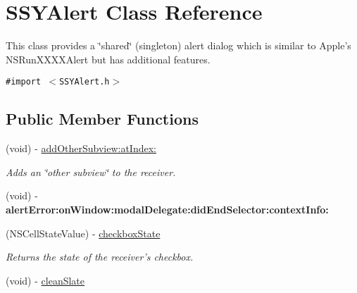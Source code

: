\hypertarget{interface_s_s_y_alert}{
\section{SSYAlert Class Reference}
\label{interface_s_s_y_alert}
}
This class provides a \char`\"{}shared\char`\"{} (singleton) alert dialog which is similar to Apple's NSRunXXXXAlert but has additional features.  


{\tt \#import $<$SSYAlert.h$>$}

\subsection*{Public Member Functions}
\begin{CompactItemize}
\item 
(void) - \hyperlink{interface_s_s_y_alert_49b267a37e1ccc629b11d792cf774c2d}{addOtherSubview:atIndex:}
\begin{CompactList}\small\item\em Adds an \char`\"{}other subview\char`\"{} to the receiver. \item\end{CompactList}\item 
\hypertarget{interface_s_s_y_alert_2b22438c8dce101377e9df9de319903b}{
(void) - \textbf{alertError:onWindow:modalDelegate:didEndSelector:contextInfo:}}
\label{interface_s_s_y_alert_2b22438c8dce101377e9df9de319903b}

\item 
(NSCellStateValue) - \hyperlink{interface_s_s_y_alert_b4d269b968b12c002a174839a8e319ad}{checkboxState}
\begin{CompactList}\small\item\em Returns the state of the receiver's checkbox. \item\end{CompactList}\item 
\hypertarget{interface_s_s_y_alert_e35134420283d7940f3115d51feabdfc}{
(void) - \hyperlink{interface_s_s_y_alert_e35134420283d7940f3115d51feabdfc}{cleanSlate}}
\label{interface_s_s_y_alert_e35134420283d7940f3115d51feabdfc}


\end{CompactItemize}
